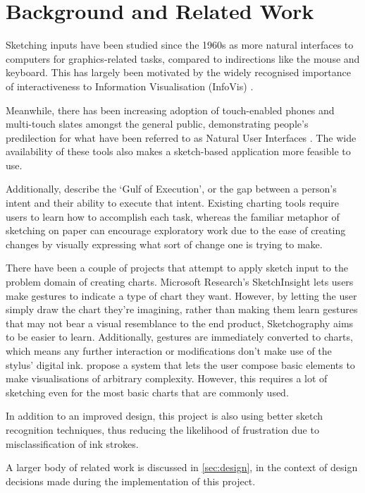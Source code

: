 \section{Background and Related Work}
Sketching inputs have been studied since the 1960s \citep{sutherland_sketch_1964} as more natural interfaces to computers for graphics-related tasks, compared to indirections like the mouse and keyboard. This has largely been motivated by the widely recognised importance of interactiveness to Information Visualisation (InfoVis) \citep{lee_beyond_2012}. 

Meanwhile, there has been increasing adoption of touch-enabled phones and multi-touch slates amongst the general public, demonstrating people's predilection for what have been referred to as Natural User Interfaces \citep{lee_beyond_2012}. The wide availability of these tools also makes a sketch-based application more feasible to use.


Additionally, \cite{norman_user_1986} describe the `Gulf of Execution', or the gap between a person's intent and their ability to execute that intent. Existing charting tools require users to learn how to accomplish each task, whereas the familiar metaphor of sketching on paper can encourage exploratory work due to the ease of creating changes by visually expressing what sort of change one is trying to make.

There have been a couple of projects that attempt to apply sketch input to the problem domain of creating charts. Microsoft Research's SketchInsight \citep{walny_understanding_2012} lets users make gestures to indicate a type of chart they want. However, by letting the user simply draw the chart they're imagining, rather than making them learn gestures that may not bear a visual resemblance to the end product, Sketchography aims to be easier to learn. Additionally, gestures are immediately converted to charts, which means any further interaction or modifications don't make use of the stylus' digital ink. \cite{chao_poster:_2010} propose a system that lets the user compose basic elements to make visualisations of arbitrary complexity. However, this requires a lot of sketching even for the most basic charts that are commonly used.

In addition to an improved design, this project is also using better sketch recognition techniques, thus reducing the likelihood of frustration due to misclassification of ink strokes.

A larger body of related work is discussed in \autoref{sec:design}, in the context of design decisions made during the implementation of this project.

